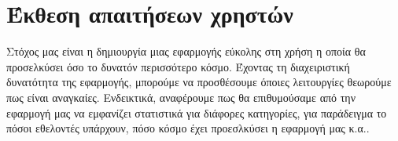 \section{Έκθεση απαιτήσεων χρηστών}

Στόχος μας είναι η δημιουργία μιας εφαρμογής εύκολης στη χρήση η οποία θα προσελκύσει όσο το δυνατόν περισσότερο κόσμο. Έχοντας τη διαχειριστική δυνατότητα της εφαρμογής, μπορούμε να προσθέσουμε όποιες λειτουργίες θεωρούμε πως είναι αναγκαίες. Ενδεικτικά, αναφέρουμε πως θα επιθυμούσαμε από την εφαρμογή μας να εμφανίζει στατιστικά για διάφορες κατηγορίες, για παράδειγμα το πόσοι εθελοντές υπάρχουν, πόσο κόσμο έχει προεσλκύσει η εφαρμογή μας κ.α..
